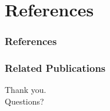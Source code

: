 \documentclass[fleqn]{beamer}
\begin{document}
 \section{References}
    
    \begin{frame}[t,allowframebreaks]\label{lastframe}
        \frametitle{References}
        
        {\scriptsize
        }
    \end{frame}
    
    \begin{frame}[t,allowframebreaks]
     \frametitle{Related Publications}
     {\scriptsize
     }
    \end{frame}

    
\begin{frame}
 \centering
 \Large
 Thank you.\\
 Questions?
\end{frame}
\end{document}
